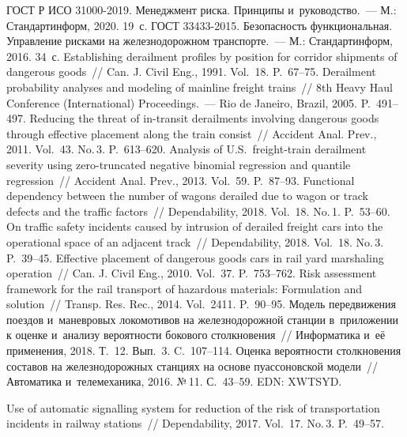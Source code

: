 \begin{multicols}{2}
{\small\frenchspacing
 {%
 \begin{thebibliography}{99}
 ГОСТ Р ИСО 31000-2019. Менеджмент риска. Принципы и~руководство.~--- М.: Стандартинформ, 2020. 19~с.
 ГОСТ 33433-2015. Безопас\-ность функциональная. Управ\-ле\-ние рисками на железнодорожном 
транс\-порте.~--- М.: Стандартинформ, 2016. 34~с.
 Establishing derailment profiles by position for corridor 
shipments of dangerous goods~// Can. J. Civil Eng., 1991. Vol.~18. P.~67--75.
 Derailment probability analyses and modeling of mainline 
freight trains~// 8th  Heavy Haul Conference (International) Proceedings.~--- Rio de Janeiro, Brazil, 
2005. P.~491--497.
 Reducing the threat of in-transit 
derailments involving dangerous goods through effective placement along the train consist~// Accident 
Anal.  Prev., 2011. Vol.~43. No.\,3. P.~613--620.
 Analysis of U.S.\ freight-train derailment 
severity using  
zero-truncated negative binomial regression and quantile regression~// Accident Anal.  Prev., 
2013. Vol.~59. P.~87--93.
 Functional 
dependency between the number of wagons derailed due to wagon or track defects and the traffic 
factors~// Dependability, 2018. Vol.~18. No.\,1. P.~53--60.
 On traffic safety 
incidents caused by intrusion of derailed freight cars into the operational space of an adjacent track~// 
Dependability, 2018. Vol.~18. No.\,3. P.~39--45.
 Effective placement of dangerous goods cars in rail yard 
marshaling operation~// Can. J. Civil Eng., 2010. Vol.~37. P.~753--762.
 Risk assessment framework for the rail transport of hazardous 
materials: Formulation and solution~// Transp. Res. Rec., 2014. Vol.~2411. P.~90--95.
 Модель передвижения поездов и~маневровых 
локомотивов на железнодорожной станции в~приложении к оценке и~анализу ве\-ро\-ят\-ности 
бокового столк\-но\-ве\-ния~// Информатика и~её применения, 2018. Т.~12. Вып.~3. C.~107--114.
 Оценка вероятности столкновения составов на железнодорожных станциях на основе пуассоновской модели~//
 Автоматика и~телемеханика, 2016.
№\,11. С.~43--59.
 EDN: XWTSYD.
 
  
 Use of automatic 
signalling system for reduction of the risk of transportation incidents in railway stations~// 
Dependability, 2017. Vol.~17. No.\,3. P.~49--57.
\end{thebibliography}

 }
 }

\end{multicols}

